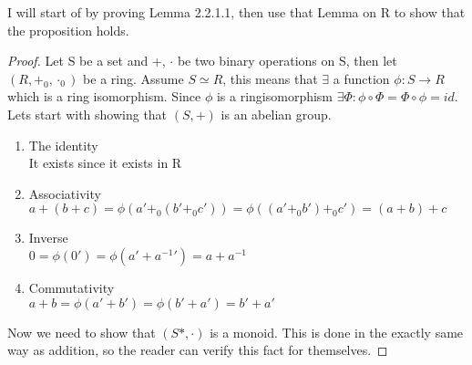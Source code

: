 \documentclass[12pt]{report}
\theoremstyle{definition}
\theoremstyle{remark}
\begin{document}
    I will start of by proving Lemma 2.2.1.1, then use that Lemma on R to show that the proposition holds.

    \begin{proof}
      Let S be a set and +, $\cdot$ be two binary operations on S, then let $(R,+_0,\cdot_0)$ be a ring. Assume $S\simeq R$, this means that $\exists$ a function $\phi:S\rightarrow R$ which is a ring isomorphism. Since $\phi$ is a ringisomorphism $\exists\Phi: \phi\circ\Phi=\Phi\circ\phi=id$.
      Lets start with showing that $(S,+)$ is an abelian group.
      \begin{enumerate}
        \item The identity\\
              It exists since it exists in R
        \item Associativity\\
              $a+(b+c)=\phi(a'+_0 (b'+_0 c'))=\phi((a'+_0 b') +_0 c')=(a+b)+c$
        \item Inverse\\
              $0=\phi(0')=\phi(a'+{a^{-1}}')=a+a^{-1}$
        \item Commutativity\\
              $a+b=\phi(a'+b')=\phi(b'+a')=b'+a'$
      \end{enumerate}
      Now we need to show that $(S*, \cdot)$ is a monoid. This is done in the
      exactly same way as addition, so the reader can verify this fact for themselves.
    \end{proof}
\end{document}
